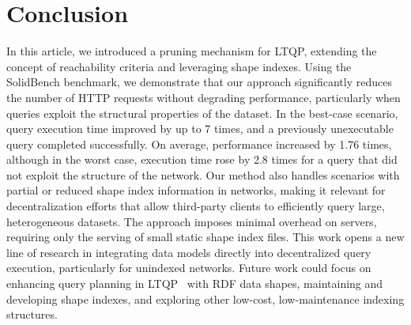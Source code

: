 \section{Conclusion}\label{sec:conclusion}

In this article, we introduced a pruning mechanism for LTQP, extending the concept of reachability criteria and leveraging shape indexes. 
Using the SolidBench benchmark, we demonstrate that our approach significantly reduces the number of HTTP requests without degrading performance, particularly when queries exploit the structural properties of the dataset.
In the best-case scenario, query execution time improved by up to 7 times, and a previously unexecutable query completed successfully.
On average, performance increased by 1.76 times, although in the worst case, execution time rose by 2.8 times for a query that did not exploit the structure of the network. 
Our method also handles scenarios with partial or reduced shape index information in networks, making it relevant for decentralization efforts that allow third-party clients to efficiently query large, heterogeneous datasets.
The approach imposes minimal overhead on servers, requiring only the serving of small static shape index files. 
This work opens a new line of research in integrating data models directly into decentralized query execution, particularly for unindexed networks.
Future work could focus on enhancing query planning in LTQP~\cite{taelman2024towards} with RDF data shapes, maintaining and developing shape indexes, and exploring other low-cost, low-maintenance indexing structures.


